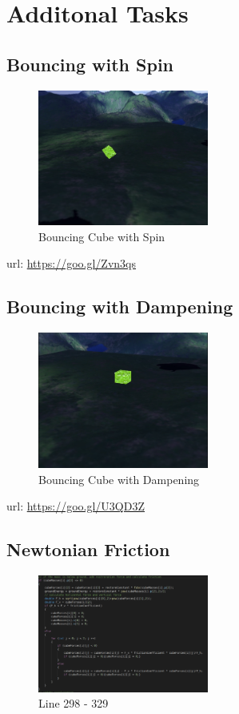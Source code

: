 \documentclass[12pt]{article}
\begin{document}
\section{Additonal Tasks}
\subsection{Bouncing with Spin}
\begin{figure}[H]
	\centering
	\includegraphics[width=0.5\textwidth]{BouncingWithSpin}
	\caption[]%
	{{\small Bouncing Cube with Spin}}    
\end{figure}
url: \url{https://goo.gl/Zvn3qs}

\subsection{Bouncing with Dampening}
\begin{figure}[H]
	\centering
	\includegraphics[width=0.5\textwidth]{BouncingWithDampening}
	\caption[]%
	{{\small Bouncing Cube with Dampening}}    
\end{figure}
url: \url{https://goo.gl/U3QD3Z}

\subsection{Newtonian Friction}
\begin{figure}[H]
	\centering
	\includegraphics[width=0.5\textwidth]{frictionCode}
	\caption[]%
	{{\small Line 298 - 329}}    
\end{figure}
\end{document}
